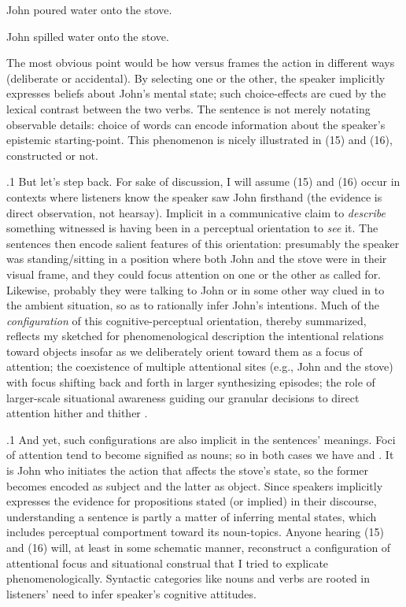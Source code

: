 \documentclass[11pt, twocolumn]{article}
\begin{document}
{{{\begin{exsGroup}
\exsItem{}  John poured water onto the stove.

\exsItem{}  John spilled water onto the stove.

\end{exsGroup}

\nip{}%
The most obvious point would be how  versus  frames the
action in different ways (deliberate or accidental). By selecting
one or the other, the speaker implicitly expresses beliefs about
John's mental state; such choice-effects are cued by the lexical contrast
between the two verbs. The
sentence is not merely notating observable details: choice of words can encode information about the speaker's
epistemic starting-point. This phenomenon
is nicely illustrated in \exsRef(15) and \exsRef(16), constructed or not.
}%

\p.1{%
But let's step back. For sake of discussion, I will assume \exsRef(15) and \exsRef(16)
occur in contexts where listeners know the speaker saw John firsthand
(the evidence is direct observation, not hearsay). Implicit
in a communicative claim to \textit{describe} something witnessed
is having been in a perceptual orientation to \textit{see} it. The
sentences then encode salient features of this orientation:
presumably the speaker was standing/sitting in a position
where both John and the stove were in their visual frame,
and they could focus attention on one or the other as
called for. Likewise, probably they were talking to
John or in some other way clued in to the ambient situation, so
as to rationally infer John's intentions. Much of the
\textit{configuration} of this cognitive-perceptual orientation,
thereby summarized, reflects my sketched 
for phenomenological description \mdash{} the intentional relations toward
objects insofar as we deliberately orient toward them
as a focus of attention; the coexistence of multiple
attentional sites (e.g., John and the stove) with focus
shifting back and forth in larger synthesizing episodes;
the role of larger-scale situational awareness guiding
our granular decisions to direct attention hither and
thither .
}%

\p.1{%
And yet, such configurations are also implicit in the
sentences' meanings. Foci of attention tend to become
signified as nouns; so in both cases we have  and
. It is John who initiates the action that
affects the stove's state, so the former becomes encoded
as subject and the latter as object. Since speakers
implicitly expresses the evidence for propositions
stated (or implied) in their discourse, understanding a
sentence is partly a matter of inferring mental states,
which includes perceptual comportment toward
its noun-topics. Anyone hearing \exsRef(15) and \exsRef(16) will,
at least in some schematic manner, reconstruct a
configuration of attentional focus and situational
construal that I tried to explicate phenomenologically.
Syntactic categories like nouns and verbs are
rooted in listeners' need to infer speaker's cognitive attitudes.
}%

}}
\end{document}
